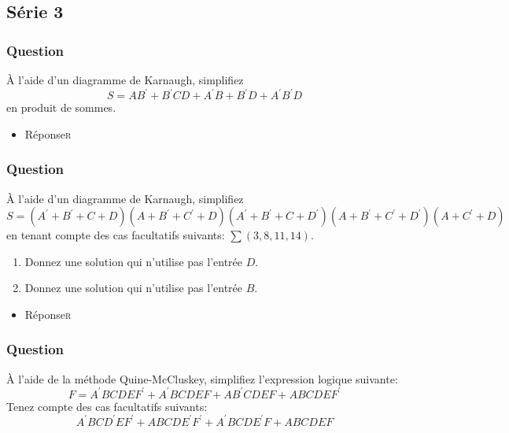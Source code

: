 \documentclass[11pt]{article}
\begin{document}
\subsection*{Série 3}
\label{sec:org882b32d}
\subsubsection*{Question}
\label{sec:org3913764}
À l'aide d'un diagramme de Karnaugh, simplifiez 
  $$
    S = A B^\prime +
    B^\prime CD + A^\prime B + B^\prime D + A^\prime B^\prime D
    $$
  en produit de sommes.

\begin{itemize}
\item Réponse\hfill{}\textsc{r}
\label{sec:orgeb60991}
\end{itemize}

\subsubsection*{Question}
\label{sec:orga1ce847}
À l'aide d'un diagramme de Karnaugh, simplifiez 
  $$
    S = ( A^\prime +
    B^\prime + C + D)(A+B^\prime +C^\prime +D)(A^\prime +B^\prime
    +C+D^\prime )(A+B^\prime +C^\prime +D^\prime )(A+C^\prime +D)
    $$
  en tenant compte des cas facultatifs suivants: \(\sum(3,8,11,14)\).
\begin{enumerate}
\item Donnez une solution qui n'utilise pas l'entrée \(D\).
\item Donnez une solution qui n'utilise pas l'entrée \(B\).
\end{enumerate}

\begin{itemize}
\item Réponse\hfill{}\textsc{r}
\label{sec:org54db20e}
\end{itemize}

\subsubsection*{Question}
\label{sec:org5416cfc}
À l'aide de la méthode Quine-McCluskey, simplifiez l'expression
  logique suivante: 
  $$
    F= A^\prime BCDEF^\prime  + A^\prime BCDEF+ AB^\prime CDEF+ ABCDEF^\prime 
    $$
  Tenez compte des cas facultatifs suivants: 
  $$
    A^\prime BCD^\prime EF^\prime +
    ABCDE^\prime F^\prime + A^\prime BCDE^\prime F+ ABCDEF
    $$
\end{document}
